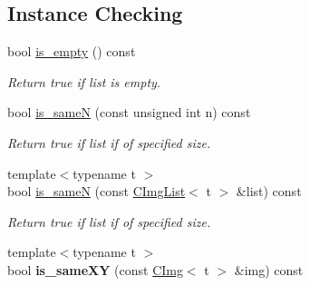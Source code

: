 \subsection*{Instance Checking}
\label{_amgrp918c881546642d9874d6c788f92e19cb}
 \begin{DoxyCompactItemize}
\item 
\hypertarget{structcimg__library_1_1CImgList_acef8e33cfd36a5d7d2fad939efcf02e3}{
bool \hyperlink{structcimg__library_1_1CImgList_acef8e33cfd36a5d7d2fad939efcf02e3}{is\_\-empty} () const }
\label{structcimg__library_1_1CImgList_acef8e33cfd36a5d7d2fad939efcf02e3}

\begin{DoxyCompactList}\small\item\em Return {\ttfamily true} if list is empty. \item\end{DoxyCompactList}\item 
\hypertarget{structcimg__library_1_1CImgList_abf45495f91f5e6e04bd597f0dd5d1ee4}{
bool \hyperlink{structcimg__library_1_1CImgList_abf45495f91f5e6e04bd597f0dd5d1ee4}{is\_\-sameN} (const unsigned int n) const }
\label{structcimg__library_1_1CImgList_abf45495f91f5e6e04bd597f0dd5d1ee4}

\begin{DoxyCompactList}\small\item\em Return {\ttfamily true} if list if of specified size. \item\end{DoxyCompactList}\item 
\hypertarget{structcimg__library_1_1CImgList_a9bb4d12695868ddb3da5054fbc8e70f0}{
{\footnotesize template$<$typename t $>$ }\\bool \hyperlink{structcimg__library_1_1CImgList_a9bb4d12695868ddb3da5054fbc8e70f0}{is\_\-sameN} (const \hyperlink{structcimg__library_1_1CImgList}{CImgList}$<$ t $>$ \&list) const }
\label{structcimg__library_1_1CImgList_a9bb4d12695868ddb3da5054fbc8e70f0}

\begin{DoxyCompactList}\small\item\em Return {\ttfamily true} if list if of specified size. \item\end{DoxyCompactList}\item 
\hypertarget{structcimg__library_1_1CImgList_a36f980621a1b6cfac495bc3664459728}{
{\footnotesize template$<$typename t $>$ }\\bool {\bfseries is\_\-sameXY} (const \hyperlink{structcimg__library_1_1CImg}{CImg}$<$ t $>$ \&img) const }
\label{structcimg__library_1_1CImgList_a36f980621a1b6cfac495bc3664459728}


\end{DoxyCompactItemize}
